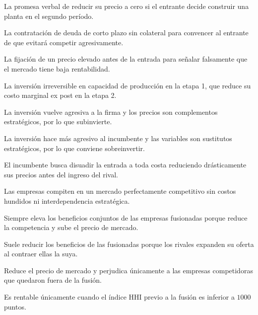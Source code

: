\begin{opts}
    \item La promesa verbal de reducir su precio a cero si el entrante decide construir una planta en el segundo período.
    \item La contratación de deuda de corto plazo sin colateral para convencer al entrante de que evitará competir agresivamente.
    \item La fijación de un precio elevado antes de la entrada para señalar falsamente que el mercado tiene baja rentabilidad.
    \item La inversión irreversible en capacidad de producción en la etapa 1, que reduce su costo marginal ex post en la etapa 2.
\end{opts}

\begin{opts}
    \item La inversión vuelve agresiva a la firma y los precios son complementos estratégicos, por lo que subinvierte.
    \item La inversión hace más agresivo al incumbente y las variables son sustitutos estratégicos, por lo que conviene sobreinvertir.
    \item El incumbente busca disuadir la entrada a toda costa reduciendo drásticamente sus precios antes del ingreso del rival.
    \item Las empresas compiten en un mercado perfectamente competitivo sin costos hundidos ni interdependencia estratégica.
\end{opts}

\begin{opts}
    \item Siempre eleva los beneficios conjuntos de las empresas fusionadas porque reduce la competencia y sube el precio de mercado.
    \item Suele reducir los beneficios de las fusionadas porque los rivales expanden su oferta al contraer ellas la suya.
    \item Reduce el precio de mercado y perjudica únicamente a las empresas competidoras que quedaron fuera de la fusión.
    \item Es rentable únicamente cuando el índice HHI previo a la fusión es inferior a $1000$ puntos.
\end{opts}

